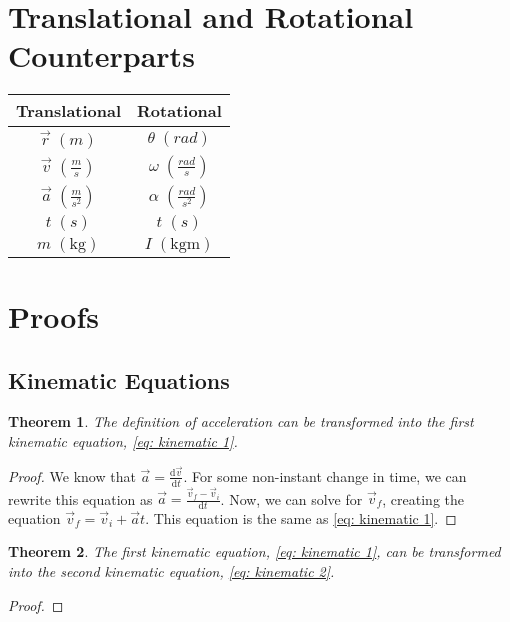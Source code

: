\documentclass{article}
\newtheorem{theorem}{Theorem}[section]
\newcommand{\unitP}[1]{\; (\mathrm{#1})}
\begin{document}
\newpage
\section{Translational and Rotational Counterparts}\label{Appendix B}

\begin{center}
\begin{tabular}{|c | c |}
    \hline
    Translational & Rotational \\
    \hline \hline
    $\vec{r} \; (m)$ & $\theta \; (rad)$ \\
    $\vec{v} \; (\frac{m}{s}) $ & $\omega \; (\frac{rad}{s})$ \\
    $\vec{a} \; (\frac{m}{s^2})$ & $\alpha \; (\frac{rad}{s^2})$ \\
    $t \; (s)$ & $t \; (s)$ \\
    \hline \hline
    $m \; (\mathrm{kg})$ & $I \unitP{kgm}$\\
    \hline
\end{tabular}
\end{center}

\newpage
\section{Proofs}\label{Appendix C}

\subsection{Kinematic Equations}
\begin{theorem}
    The definition of acceleration can be transformed into the first kinematic equation, \ref{eq: kinematic 1}.
\end{theorem}
\begin{proof}
    We know that $\vec{a} = \frac{\mathrm{d}\vec{v}}{\mathrm{d}t}$. For some non-instant change in time, we can rewrite this equation as 
    $\vec{a} = \frac{\vec{v}_f - \vec{v}_i}{\mathrm{d}t}$. Now, we can solve for $\vec{v}_f$, creating the equation $\vec{v}_f = \vec{v}_i + \vec{a}t$.
    This equation is the same as \ref{eq: kinematic 1}.
\end{proof}

\begin{theorem}
    The first kinematic equation, \ref{eq: kinematic 1}, can be transformed into the second kinematic equation, \ref{eq: kinematic 2}.
\end{theorem}
\begin{proof}
      
\end{proof}
\end{document}
